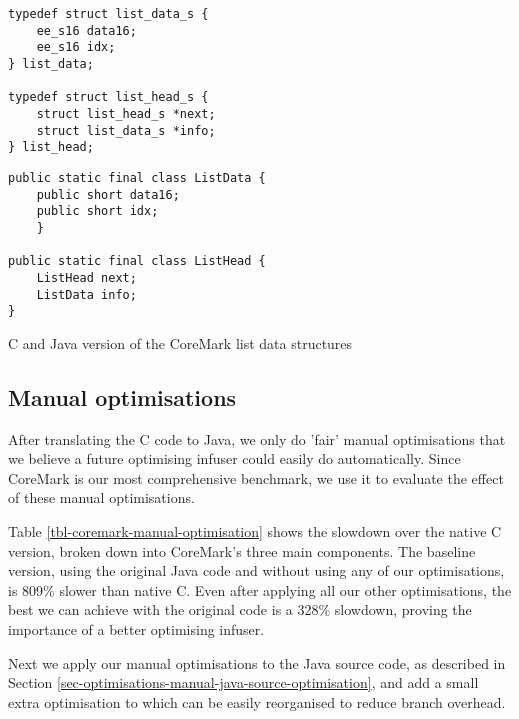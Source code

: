 \begin{listing}
\centering
\begin{minipage}[t]{0.48\textwidth}
\centering
\begin{verbatim}
typedef struct list_data_s {
    ee_s16 data16;
    ee_s16 idx;
} list_data;

typedef struct list_head_s {
    struct list_head_s *next;
    struct list_data_s *info;
} list_head;
\end{verbatim}
\end{minipage}\hfill
\begin{minipage}[t]{0.48\textwidth}
\centering
\begin{verbatim}
public static final class ListData {
    public short data16;
    public short idx;
    }

public static final class ListHead {
    ListHead next;
    ListData info;
}
\end{verbatim}
\end{minipage}
\caption{C and Java version of the CoreMark list data structures}
\label{lst-coremark-list-data-structures}
\end{listing}

\subsection{Manual optimisations}
\label{sec-evaluation-manual-optimisations}
After translating the C code to Java, we only do 'fair' manual optimisations that we believe a future optimising infuser could easily do automatically. Since CoreMark is our most comprehensive benchmark, we use it to evaluate the effect of these manual optimisations.



Table \ref{tbl-coremark-manual-optimisation} shows the slowdown over the native C version, broken down into CoreMark's three main components. The baseline version, using the original Java code and without using any of our optimisations, is 809\% slower than native C. Even after applying all our other optimisations, the best we can achieve with the original code is a 328\% slowdown, proving the importance of a better optimising infuser.

Next we apply our manual optimisations to the Java source code, as described in Section \ref{sec-optimisations-manual-java-source-optimisation}, and add a small extra optimisation to  which can be easily reorganised to reduce branch overhead.

